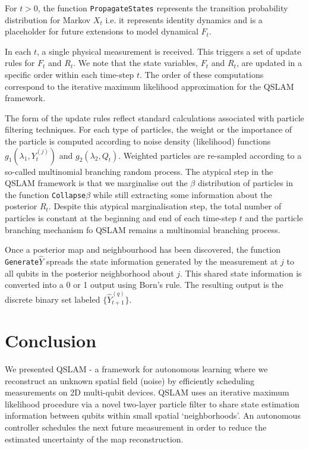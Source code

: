 \documentclass[reprint,longbibliography]{revtex4-1} %
\begin{document}
For $t>0$, the function \texttt{PropagateStates} represents the transition probability distribution for Markov $X_t$ i.e. it represents identity dynamics and is a placeholder for future extensions to model dynamical $F_t$. 

In each $t$, a single physical measurement is received. This triggers a set of update rules for $F_t$ and $R_t$. We note that the state variables, $F_t$ and $R_t$, are updated in a specific order within each time-step $t$. The order of these computations correspond to the iterative maximum likelihood approximation for the QSLAM framework.

The form of the update rules reflect standard calculations associated with particle filtering techniques. For each type of particles, the weight or the importance of the particle is  computed according to noise density (likelihood) functions  $g_1(\lambda_1, Y_t^{(j)})$ and $g_2(\lambda_2, Q_t)$. Weighted particles are re-sampled according to a so-called multinomial branching random process. The atypical step in the QSLAM framework is that we marginalise out the $\beta$ distribution of particles in the function \texttt{Collapse$\beta$} while still extracting some information about the posterior $R_t$. Despite this atypical marginalisation step, the total number of particles is constant at the beginning and end of each time-step $t$ and the particle branching mechanism fo QSLAM remains a multinomial branching process. 

Once a posterior map and neighbourhood has been discovered, the function \texttt{Generate$\hat{Y}$} spreads the state information generated by the measurement at $j$ to all qubits in the posterior neighborhood about $j$. This shared state information is converted into a 0 or 1 output using Born's rule. The resulting output is the discrete binary set labeled  $\{\hat{Y}_{t+1}^{(q)} \}$. 

\section{Conclusion \label{sec:conclusion}}


We presented QSLAM - a framework for autonomous learning where we reconstruct an unknown spatial field (noise) by efficiently scheduling measurements on 2D multi-qubit devices.  QSLAM uses an iterative maximum likelihood procedure via a novel two-layer particle filter to share state estimation information  between qubits within small spatial `neighborhoods'. An autonomous controller schedules the next future measurement in order to reduce the estimated uncertainty of the map reconstruction.  
\end{document}
